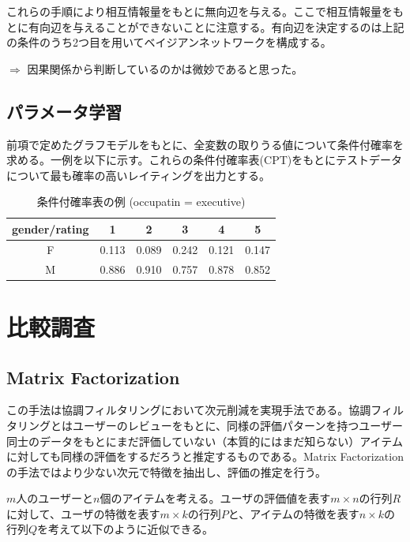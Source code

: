 \documentclass[a4j,12pt]{jarticle}
\begin{document}
これらの手順により相互情報量をもとに無向辺を与える。ここで相互情報量をもとに有向辺を与えることができないことに注意する。有向辺を決定するのは上記の条件のうち2つ目を用いてベイジアンネットワークを構成する。

$\Rightarrow$ 因果関係から判断しているのかは微妙であると思った。

\subsection{パラメータ学習}

前項で定めたグラフモデルをもとに、全変数の取りうる値について条件付確率を求める。一例を以下に示す。これらの条件付確率表(CPT)をもとにテストデータについて最も確率の高いレイティングを出力とする。

\begin{table}[H]
\begin{center}
\caption{条件付確率表の例 (occupatin = executive)}
\begin{tabular}{|c||c|c|c|c|c|} \hline  
gender/rating & 1 & 2 & 3 & 4 & 5 \\ \hline \hline
F & 0.113 & 0.089 & 0.242 & 0.121 & 0.147 \\
M & 0.886 & 0.910 & 0.757 & 0.878 & 0.852 \\ \hline
\end{tabular}
\end{center}
\end{table}

\section{比較調査}

\subsection{Matrix Factorization}

この手法は協調フィルタリングにおいて次元削減を実現手法である。協調フィルタリングとはユーザーのレビューをもとに、同様の評価パターンを持つユーザー同士のデータをもとにまだ評価していない（本質的にはまだ知らない）アイテムに対しても同様の評価をするだろうと推定するものである。Matrix Factorization の手法ではより少ない次元で特徴を抽出し、評価の推定を行う。

$m$人のユーザーと$n$個のアイテムを考える。ユーザの評価値を表す$m \times n$の行列$R$に対して、ユーザの特徴を表す$m \times k$の行列$P$と、アイテムの特徴を表す$n \times k$の行列$Q$を考えて以下のように近似できる。
\end{document}
